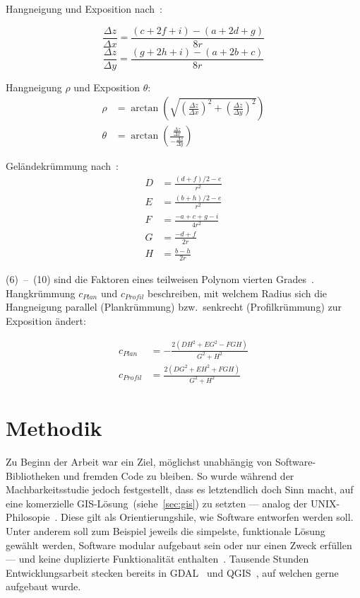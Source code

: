 Hangneigung und Exposition nach~\cite{gisslopeaspect}:

\begin{equation} \label{eq1}
  \frac{\Delta z}{\Delta x} = \frac{(c + 2f + i) - (a + 2d + g)}{8r}
\end{equation}
\begin{equation} \label{eq2}
  \frac{\Delta z}{\Delta y} = \frac{(g + 2h + i) - (a + 2b + c)}{8r}
\end{equation}

Hangneigung $\rho$ und Exposition $\theta$:
\begin{align}
  \rho &= \arctan \left( \sqrt{
    {\left( \frac{\Delta z}{\Delta x}\right)}^2 + 
    {\left(\frac{\Delta z}{\Delta y}\right)}^2}
  \right)\\
  \theta &= \arctan\left(\frac{\frac{\Delta z}{\Delta x}}{-\frac{\Delta z}{\Delta y}}\right)
\end{align}

Geländekrümmung nach~\cite{gismath}:
\begin{align}
  D &= \frac{{(d + f) / 2 - e}}{{r^2}} \\
  E &= \frac{{(b + h) / 2 - e}}{{r^2}} \\
  F &= \frac{{-a + c + g - i}}{{4r^2}} \\
  G &= \frac{{-d + f}}{{2r}} \\
  H &= \frac{{b - h}}{{2r}}
\end{align}

(6)~--~(10) sind die Faktoren eines teilweisen Polynom vierten Grades~\cite{gismath}.
Hangkrümmung $c_{Plan}$ und $c_{Profil}$ beschreiben, mit welchem Radius sich die Hangneigung parallel (Plankrümmung) bzw.\ senkrecht (Profilkrümmung) zur Exposition ändert:

\begin{align}
    c_{Plan} &= -\frac{{2(DH^2 + EG^2 - FGH)}}{{G^2 + H^2}}
    \\
    c_{Profil} &= \frac{{2(DG^2 + EH^2 + FGH)}}{{G^2 + H^2}}
\end{align}

\vfill

\pagebreak





\section{Methodik}

Zu Beginn der Arbeit war ein Ziel, möglichst unabhängig von Software-Bibliotheken und fremden Code zu bleiben. So wurde während der Machbarkeitsstudie jedoch festgestellt, dass es letztendlich doch Sinn macht, auf eine komerzielle GIS-Lösung~(siehe~\ref{sec:gis}) zu setzten --- analog der UNIX-Philosopie~\cite{unixphil}. Diese gilt als Orientierungshile, wie Software entworfen werden soll. Unter anderem soll zum Beispiel jeweils die simpelste, funktionale Lösung gewählt werden, Software modular aufgebaut sein oder nur einen Zweck erfüllen --- und keine duplizierte Funktionalität enthalten~\cite{unixphil}. Tausende Stunden Entwicklungsarbeit stecken bereits in GDAL~\cite{gdalmanual} und QGIS~\cite{qgis}, auf welchen gerne aufgebaut wurde.
